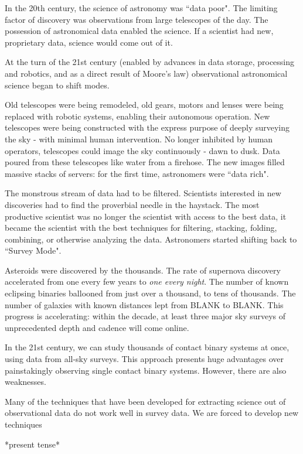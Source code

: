 \documentclass[12pt]{article} %
\numberwithin{equation}{section} %
\begin{document}
In the 20th century, the science of astronomy was ``data poor". The limiting factor of discovery was observations from large telescopes of the day. The possession of astronomical data enabled the science. If a scientist had new, proprietary data, science would come out of it.

At the turn of the 21st century (enabled by advances in data storage, processing and robotics, and as a direct result of Moore's law) observational astronomical science began to shift modes.

Old telescopes were being remodeled, old gears, motors and lenses were being replaced with robotic systems, enabling their autonomous operation. New telescopes were being constructed with the express purpose of deeply surveying the sky - with minimal human intervention. No longer inhibited by human operators, telescopes could image the sky continuously - dawn to dusk. Data poured from these telescopes like water from a firehose. The new images filled massive stacks of servers: for the first time, astronomers were ``data rich". 

The monstrous stream of data had to be filtered. Scientists interested in new discoveries had to find the proverbial needle in the haystack. The most productive scientist was no longer the scientist with access to the best data, it became the scientist with the best techniques for filtering, stacking, folding, combining, or otherwise analyzing the data. Astronomers started shifting back to ``Survey Mode".

Asteroids were discovered by the thousands. The rate of supernova discovery accelerated from one every few years to \emph{one every night}.  The number of known eclipsing binaries ballooned from just over a thousand, to tens of thousands. The number of galaxies with known distances lept from BLANK to BLANK. This progress is accelerating: within the decade, at least three major sky surveys of unprecedented depth and cadence will come online.

In the 21st century, we can study thousands of contact binary systems at once, using data from all-sky surveys. This approach presents huge advantages over painstakingly observing single contact binary systems. However, there are also weaknesses. 

Many of the techniques that have been developed for extracting science out of observational data do not work well in survey data. We are forced to develop new techniques 

*present tense*
\end{document}
